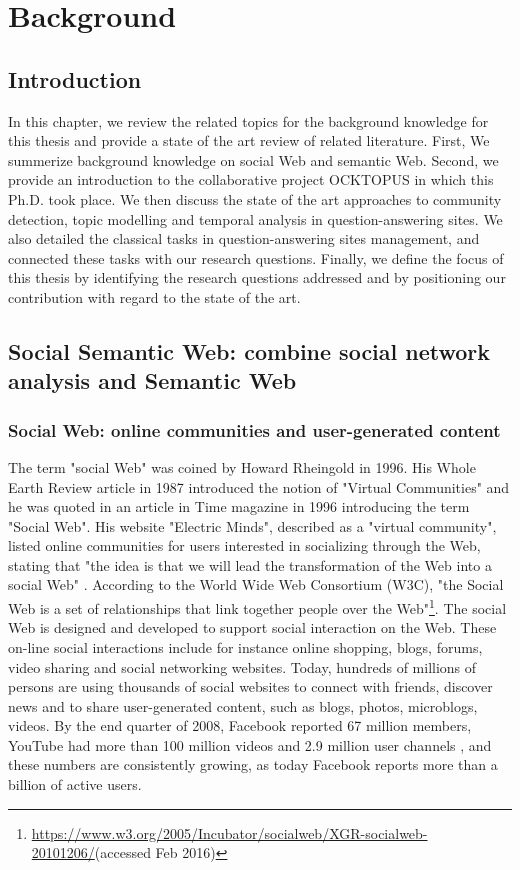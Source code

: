 \chapter{Background}
\doublespacing
\label{chap:background}
\minitoc


\section{Introduction}
In this chapter, we review the related topics for the background knowledge for this thesis and provide a state of the art review of related literature. First, We summerize background knowledge on social Web and semantic Web.
Second, we provide an introduction to the collaborative project OCKTOPUS in which this Ph.D. took place.
We then discuss the state of the art approaches to community detection, topic modelling and temporal analysis in question-answering sites.
We also detailed the classical tasks in question-answering sites management, and connected these tasks with our research questions.
Finally, we define the focus of this thesis by identifying the research questions addressed and by  positioning our contribution with regard to the state of the art.

\section{Social Semantic Web: combine social network analysis and Semantic Web}

\subsection{Social Web: online communities and user-generated content}
The term "social Web" was coined by Howard Rheingold in 1996. His Whole Earth Review article in 1987 introduced the notion of "Virtual Communities" and he was quoted in an article in Time magazine in 1996 introducing the term "Social Web". His website "Electric Minds", described as a "virtual community", listed online communities for users interested in socializing through the Web, stating that "the idea is that we will lead the transformation of the Web into a social Web" \cite{rheingold2000virtual}. According to the World Wide Web Consortium (W3C), "the Social Web is a set of relationships that link together people over the Web"\footnote{\url{https://www.w3.org/2005/Incubator/socialweb/XGR-socialweb-20101206/}(accessed Feb 2016)}. The social Web is designed and developed to support social interaction  \cite{porter2010designing} on the Web. These on-line social interactions include for instance online shopping, blogs, forums, video sharing and social networking websites. Today, hundreds of millions of persons are using thousands of social websites to connect with friends, discover news and to share user-generated content, such as blogs, photos, microblogs, videos. By the end quarter of 2008, Facebook reported 67 million members, YouTube had more than 100 million videos and 2.9 million user channels  \cite{watson2008causewired}, and these numbers are consistently growing, as today Facebook reports more than a billion of active users.  



